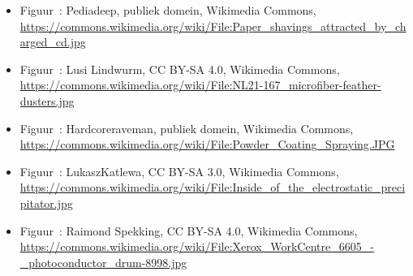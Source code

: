 \documentclass{ximera}
\begin{document}
\begin{itemize}
        \item Figuur~: Pediadeep, publiek domein, Wikimedia Commons, \url{https://commons.wikimedia.org/wiki/File:Paper_shavings_attracted_by_charged_cd.jpg}
        \item Figuur~: Lusi Lindwurm, CC BY-SA 4.0, Wikimedia Commons, \url{https://commons.wikimedia.org/wiki/File:NL21-167_microfiber-feather-dusters.jpg}
        \item Figuur~: Hardcoreraveman, publiek domein, Wikimedia Commons, \url{https://commons.wikimedia.org/wiki/File:Powder_Coating_Spraying.JPG}
        \item Figuur~: LukaszKatlewa, CC BY-SA 3.0, Wikimedia Commons, \url{https://commons.wikimedia.org/wiki/File:Inside_of_the_electrostatic_precipitator.jpg}
        \item Figuur~: Raimond Spekking, CC BY-SA 4.0, Wikimedia Commons, \url{https://commons.wikimedia.org/wiki/File:Xerox_WorkCentre_6605_-_photoconductor_drum-8998.jpg}
\end{itemize}
\end{document}
